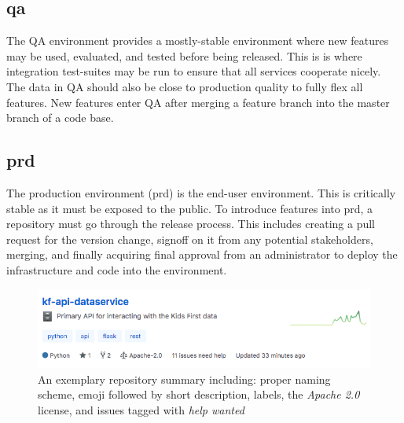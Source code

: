 \documentclass[a4paper,12pt,titlepage]{scrartcl}
\begin{document}
	\subsection{qa}
	
	The QA environment provides a mostly-stable environment where new features may be used, evaluated, and tested before being released.
	This is is where integration test-suites may be run to ensure that all services cooperate nicely.
	The data in QA should also be close to production quality to fully flex all features.
	New features enter QA after merging a feature branch into the master branch of a code base.
	
	\subsection{prd}
	
	The production environment (prd) is the end-user environment.
	This is critically stable as it must be exposed to the public.
	To introduce features into prd, a repository must go through the release process.
	This includes creating a pull request for the version change, signoff on it from any potential stakeholders, merging, and finally acquiring final approval from an administrator to deploy the infrastructure and code into the environment.
	
	\begin{figure}
    		\centering
    		\includegraphics[width=0.6\linewidth]{images/reposummary.png}
    		\caption{An exemplary repository summary including: proper naming scheme, emoji followed by short description, labels, the {\em Apache 2.0} license, and issues tagged with {\em help wanted}}
    		\label{fig:reposummary}
    \end{figure}

	
	 
\end{document}
